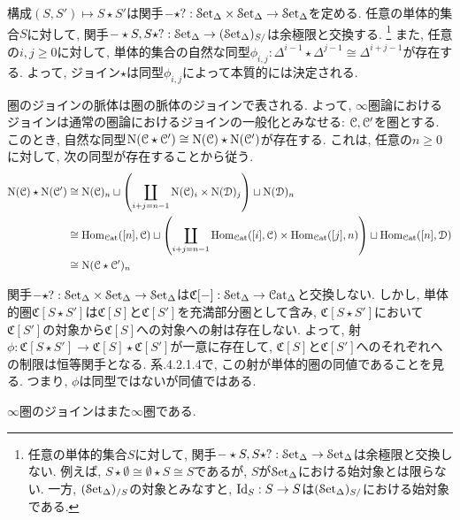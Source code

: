 \documentclass[uplatex, a4paper, 14Q, dvipdfmx]{jsreport}
\begin{document}

\begin{remark} \label{rem.1.2.8.2}
  構成$(S,S') \mapsto S \star S'$は関手$- \star ? : \mathcal{S}\mathrm{et}_{\Delta} \times \mathcal{S}\mathrm{et}_{\Delta} \to \mathcal{S}\mathrm{et}_{\Delta}$を定める. 
  任意の単体的集合$S$に対して, 関手$- \star S, S \star ? : \mathcal{S}\mathrm{et}_{\Delta} \to (\mathcal{S}\mathrm{et}_{\Delta})_{S/}$は余極限と交換する. 
  \footnote{
    任意の単体的集合$S$に対して, 関手$- \star S, S \star ? : \mathcal{S}\mathrm{et}_{\Delta} \to \mathcal{S}\mathrm{et}_{\Delta}$は余極限と交換しない. 
    例えば, $S \star \emptyset \cong \emptyset \star S \cong S$であるが, $S$が$\mathcal{S}\mathrm{et}_{\Delta}$における始対象とは限らない. 
    一方, $(\mathcal{S}\mathrm{et}_{\Delta})_{/S}$の対象とみなすと, $\mathrm{Id}_S : S \to S$は$(\mathcal{S}\mathrm{et}_{\Delta})_{S/}$における始対象である. 
  }
  また, 任意の$i,j \geq 0$に対して, 単体的集合の自然な同型$\phi_{i,j} : \Delta^{i-1} \star \Delta^{j-1} \cong \Delta^{i+j-1}$が存在する. 
  よって, ジョイン$\star$は同型$\phi_{i,j}$によって本質的には決定される. 

  圏のジョインの脈体は圏の脈体のジョインで表される. 
  よって, $\infty$圏論におけるジョインは通常の圏論におけるジョインの一般化とみなせる:
  $\mathcal{C},\mathcal{C}'$を圏とする. 
  このとき, 自然な同型$\mathrm{N}(\mathcal{C} \star \mathcal{C}') \cong \mathrm{N}(\mathcal{C}) \star \mathrm{N}(\mathcal{C}')$が存在する.
  これは, 任意の$n \geq 0$に対して, 次の同型が存在することから従う. 
  \begin{align*}
    \mathrm{N}(\mathcal{C}) \star \mathrm{N}(\mathcal{C}')
    & \cong \mathrm{N}(\mathcal{C})_n \sqcup \qty(\coprod_{i+j=n-1} \mathrm{N}(\mathcal{C})_i \times \mathrm{N}(\mathcal{D})_j) \sqcup \mathrm{N}(\mathcal{D})_n \\
    & \cong \mathrm{Hom}_{\mathcal{C}\mathrm{at}}([n],\mathcal{C}) \sqcup \qty(\coprod_{i+j=n-1} \mathrm{Hom}_{\mathcal{C}\mathrm{at}}([i],\mathcal{C}) \times \mathrm{Hom}_{\mathcal{C}\mathrm{at}}([j],n)) \sqcup \mathrm{Hom}_{\mathcal{C}\mathrm{at}}([n],\mathcal{D}) \\
    & \cong \mathrm{N}(\mathcal{C} \star \mathcal{C}')_n
  \end{align*}

  関手$- \star ? : \mathcal{S}\mathrm{et}_{\Delta} \times \mathcal{S}\mathrm{et}_{\Delta} \to \mathcal{S}\mathrm{et}_{\Delta}$は$\mathfrak{C}[-] : \mathcal{S}\mathrm{et}_{\Delta} \to \mathcal{C}\mathrm{at}_\Delta$と交換しない.
  しかし, 単体的圏$\mathfrak{C}[S \star S']$は$\mathfrak{C}[S]$と$\mathfrak{C}[S']$を充満部分圏として含み, $\mathfrak{C}[S \star S']$において$\mathfrak{C}[S']$の対象から$\mathfrak{C}[S]$への対象への射は存在しない. 
  よって, 射$\phi : \mathfrak{C}[S \star S'] \to \mathfrak{C}[S] \star \mathfrak{C}[S']$が一意に存在して, $\mathfrak{C}[S]$と$\mathfrak{C}[S']$へのそれぞれへの制限は恒等関手となる. 
  系.4.2.1.4で, この射が単体的圏の同値であることを見る. 
  つまり, $\phi$は同型ではないが同値ではある. 
\end{remark}

$\infty$圏のジョインはまた$\infty$圏である.
\end{document}
